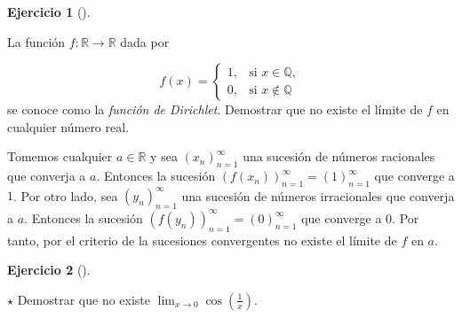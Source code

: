 \documentclass[
  spanish,
  a4paper,
]{scrreport}
\theoremstyle{definition}
\newtheorem{exercise}{Ejercicio}[chapter]
\theoremstyle{remark}
\begin{document}
\begin{exercise}[]\protect\hypertarget{exr-limite-funcion-Dirichlet}{}\label{exr-limite-funcion-Dirichlet}

La función \(f:\mathbb{R}\to \mathbb{R}\) dada por

\[
f(x)=\begin{cases}
1, & \mbox{si } x\in\mathbb{Q},\\ 
0, & \mbox{si } x\not\in \mathbb{Q}
\end{cases}
\] se conoce como la \emph{función de Dirichlet}. Demostrar que no
existe el límite de \(f\) en cualquier número real.

\end{exercise}

\begin{tcolorbox}[enhanced jigsaw, arc=.35mm, bottomrule=.15mm, bottomtitle=1mm, breakable, colback=white, colbacktitle=quarto-callout-tip-color!10!white, colframe=quarto-callout-tip-color-frame, coltitle=black, left=2mm, leftrule=.75mm, opacityback=0, opacitybacktitle=0.6, rightrule=.15mm, title=\textcolor{quarto-callout-tip-color}{\faLightbulb}\hspace{0.5em}{Solución}, titlerule=0mm, toprule=.15mm, toptitle=1mm]

Tomemos cualquier \(a\in\mathbb{R}\) y sea \((x_n)_{n=1}^\infty\) una
sucesión de números racionales que converja a \(a\). Entonces la
sucesión \((f(x_n))_{n=1}^\infty = (1)_{n=1}^\infty\) que converge a
\(1\). Por otro lado, sea \((y_n)_{n=1}^\infty\) una sucesión de números
irracionales que converja a \(a\). Entonces la sucesión
\((f(y_n))_{n=1}^\infty = (0)_{n=1}^\infty\) que converge a \(0\). Por
tanto, por el criterio de la sucesiones convergentes no existe el límite
de \(f\) en \(a\).

\end{tcolorbox}

\begin{exercise}[]\protect\hypertarget{exr-limite-coseno}{}\label{exr-limite-coseno}

\(\star\) Demostrar que no existe
\(\lim_{x\to 0}\cos\left(\frac{1}{x}\right)\).

\end{exercise}
\end{document}

